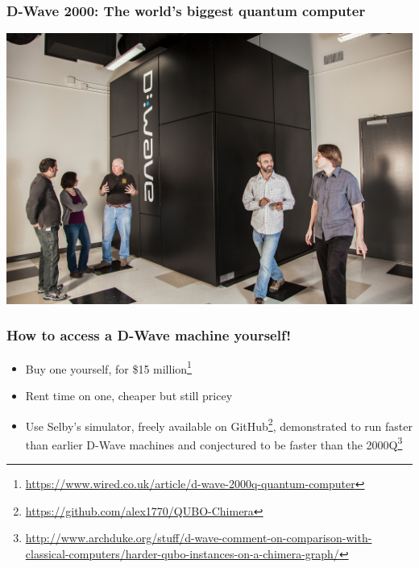 \documentclass[]{beamer}
\begin{document}
\begin{frame}
\frametitle{D-Wave 2000: The world's biggest quantum computer}

\begin{center}
\includegraphics[scale=0.2]{dwave}
\end{center}
\end{frame}

\begin{frame}
\frametitle{How to access a D-Wave machine yourself!}

\begin{itemize}
\item<1-> Buy one yourself, for \$15 million\footnote{\url{https://www.wired.co.uk/article/d-wave-2000q-quantum-computer}}
\item<2-> Rent time on one, cheaper but still pricey
\item<3-> Use Selby's simulator, freely available on GitHub\footnote{\url{https://github.com/alex1770/QUBO-Chimera}}, demonstrated to run faster than earlier D-Wave machines and conjectured to be faster than the 2000Q\footnote{\url{http://www.archduke.org/stuff/d-wave-comment-on-comparison-with-classical-computers/harder-qubo-instances-on-a-chimera-graph/}}
\end{itemize}
\end{frame}
\end{document}
